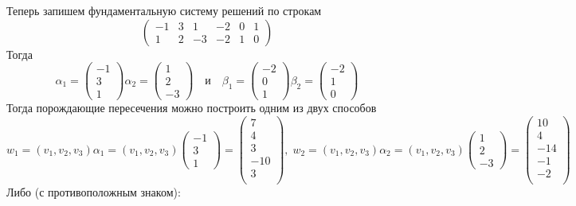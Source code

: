 \documentclass{article}
\begin{document}
Теперь запишем фундаментальную систему решений по строкам
\[
\left(
\begin{array}{ccc|ccc}
-1&3&1&-2&0&1\\
1&2&-3&-2&1&0
\end{array}
\right) 
\]
Тогда
\[
\alpha_1 =
\begin{pmatrix}
-1\\3\\1
\end{pmatrix}
\alpha_2 =
\begin{pmatrix}
1\\2\\-3
\end{pmatrix}
\quad
\text{и}
\quad
\beta_1 =
\begin{pmatrix}
-2\\0\\1
\end{pmatrix}
\beta_2 =
\begin{pmatrix}
-2\\1\\0
\end{pmatrix}
\]
Тогда порождающие пересечения можно построить одним из двух способов
\[
w_1 = (v_1, v_2, v_3) \alpha_1 =
(v_1, v_2, v_3)
\begin{pmatrix}
-1\\3\\1
\end{pmatrix}
=
\begin{pmatrix}
{7}\\
{4}\\
{3}\\
{-10}\\
{3}\\
\end{pmatrix}
,\;
w_2 = (v_1, v_2, v_3) \alpha_2 =
(v_1, v_2, v_3)\begin{pmatrix}
1\\2\\-3
\end{pmatrix}
=
\begin{pmatrix}
{10}\\
{4}\\
{-14}\\
{-1}\\
{-2}\\
\end{pmatrix}
\]
Либо (с противоположным знаком):
\end{document}
